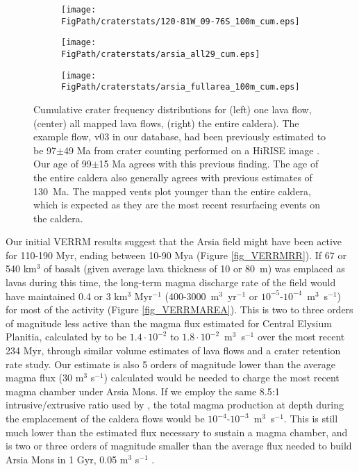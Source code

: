 \begin{figure}
\centering
\begin{subfigure}{.32\textwidth}
  \texttt{[image: \\FigPath/craterstats/120-81W\_09-76S\_100m\_cum.eps]}
\end{subfigure}
\begin{subfigure}{.32\textwidth}
  \texttt{[image: \\FigPath/craterstats/arsia\_all29\_cum.eps]}
\end{subfigure}
\begin{subfigure}{.32\textwidth}
  \texttt{[image: \\FigPath/craterstats/arsia\_fullarea\_100m\_cum.eps]}
\end{subfigure}
\caption{Cumulative crater frequency distributions for (left) one lava flow, (center) all mapped lava flows, (right) the entire caldera). The example flow, v03 in our database, had been previously estimated to be 97$\pm$49 Ma from crater counting performed on a HiRISE image \citep{robbins2011volcanic}. Our age of 99$\pm$15 Ma agrees with this previous finding. The age of the entire caldera also generally agrees with previous estimates of 130~Ma. The mapped vents plot younger than the entire caldera, which is expected as they are the most recent resurfacing events on the caldera.}
\label{fig_craterct}
\end{figure}

Our initial VERRM results suggest that the Arsia field might have been active for 110-190 Myr, ending between 10-90 Mya (Figure \ref{fig_VERRMRR}). If 67 or 540 km$^3$ of basalt (given average lava thickness of 10 or 80~m) was emplaced as lavas during this time, the long-term magma discharge rate of the field would have maintained 0.4 or 3 km$^3$ Myr$^{-1}$ (400-3000~m$^3$~yr$^{-1}$ or $10^{-5}$-$10^{-4}$~m$^3$~s$^{-1}$) for most of the activity (Figure \ref{fig_VERRMAREA}). This is two to three orders of magnitude less active than the magma flux estimated for Central Elysium Planitia, calculated by \citet{vaucher2009volcanic} to be $1.4\cdot 10^{-2}$ to $1.8\cdot 10^{-2}$~m$^3$~s$^{-1}$ over the most recent 234 Myr, through similar volume estimates of lava flows and a crater retention rate study. Our estimate is also 5 orders of magnitude lower than the average magma flux (30 m$^3$ s$^{-1}$) \citet{wilson2001evidence} calculated would be needed to charge the most recent magma chamber under Arsia Mons. If we employ the same 8.5:1 intrusive/extrusive ratio used by \citet{greeley1991magma}, the total magma production at depth during the emplacement of the caldera flows would be $10^{-4}$-$10^{-3}$~m$^3$~s$^{-1}$. This is still much lower than the estimated flux necessary to sustain a magma chamber, and is two or three orders of magnitude smaller than the average flux needed to build Arsia Mons in 1 Gyr, 0.05 m$^3$ s$^{-1}$ \citep{wilson2001evidence}.

